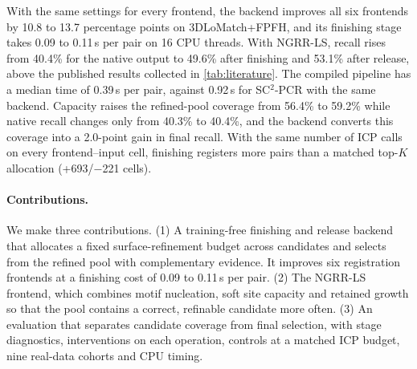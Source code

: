 With the same settings for every frontend, the backend improves all six frontends by 10.8 to 13.7 percentage points on 3DLoMatch+FPFH, and its finishing stage takes 0.09 to 0.11\,s per pair on 16 CPU threads. With NGRR-LS, recall rises from 40.4\% for the native output to 49.6\% after finishing and 53.1\% after release, above the published results collected in \cref{tab:literature}. The compiled pipeline has a median time of 0.39\,s per pair, against 0.92\,s for SC$^2$-PCR with the same backend. Capacity raises the refined-pool coverage from 56.4\% to 59.2\% while native recall changes only from 40.3\% to 40.4\%, and the backend converts this coverage into a 2.0-point gain in final recall. With the same number of ICP calls on every frontend--input cell, finishing registers more pairs than a matched top-$K$ allocation (+693/$-$221 cells).

\paragraph{Contributions.} We make three contributions. (1) A training-free finishing and release backend that allocates a fixed surface-refinement budget across candidates and selects from the refined pool with complementary evidence. It improves six registration frontends at a finishing cost of 0.09 to 0.11\,s per pair. (2) The NGRR-LS frontend, which combines motif nucleation, soft site capacity and retained growth so that the pool contains a correct, refinable candidate more often. (3) An evaluation that separates candidate coverage from final selection, with stage diagnostics, interventions on each operation, controls at a matched ICP budget, nine real-data cohorts and CPU timing.
